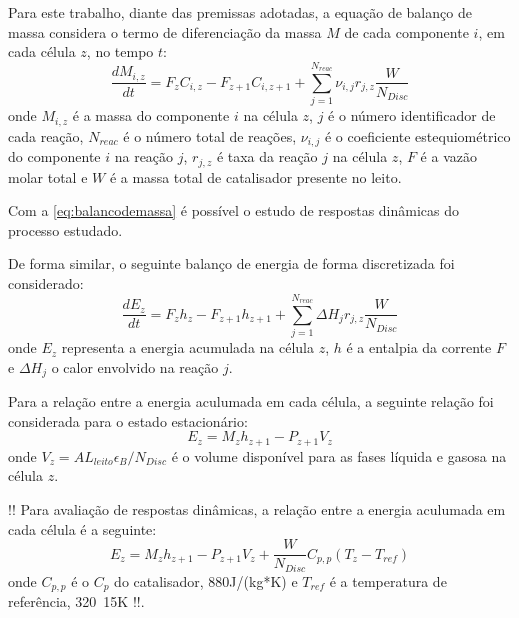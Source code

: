 Para este trabalho, diante das premissas adotadas, a equação de balanço de massa
considera o termo de diferenciação da massa $M$ de cada componente $i$, em cada
célula $z$, no tempo $t$: 
\begin{equation}
\dfrac{dM_{i,z}}{dt} = F_zC_{i,z} - F_{z+1}C_{i,z+1} +
\displaystyle\sum_{j=1}^{N_{reac}} \nu_{i,j}r_{j,z} \dfrac{W}{N_{Disc}}
\label{eq:balancodemassa}
\end{equation}
onde $M_{i,z}$ é a massa do componente $i$ na célula $z$, $j$ é o número
identificador de cada reação, $N_{reac}$ é o número total de reações,
$\nu_{i,j}$ é o coeficiente estequiométrico do componente $i$ na reação $j$,
$r_{j,z}$ é taxa da reação $j$ na célula $z$, $F$ é a vazão molar total e $W$ é
a massa total de catalisador presente no leito.

Com a \autoref{eq:balancodemassa} é possível o estudo de respostas dinâmicas do
processo estudado.


De forma similar, o seguinte balanço de energia de forma
discretizada foi considerado:
\begin{equation}
\dfrac{dE_{z}}{dt} = F_zh_{z} - F_{z+1}h_{z+1} +
\displaystyle\sum_{j=1}^{N_{reac}} \Delta H_{j}r_{j,z} \dfrac{W}{N_{Disc}}
\label{eq:balancodeenergia}
\end{equation}
onde $E_{z}$ representa a energia acumulada na célula $z$, $h$ é a entalpia da
corrente $F$ e $\Delta H_{j}$ o calor envolvido na reação $j$.

Para a relação entre a energia aculumada em cada célula, a seguinte relação
foi considerada para o estado estacionário:
\begin{equation}
E_{z} = M_{z}h_{z+1} - P_{z+1}V_{z}
\label{eq:holdupenergia}
\end{equation}
onde $V_{z} = AL_{leito}\epsilon_{B}/N_{Disc}$ é o volume disponível para as
fases líquida e gasosa na célula $z$.

!! Para avaliação de respostas dinâmicas, a relação entre a energia aculumada em
cada célula é a seguinte:
\begin{equation}
E_{z} = M_{z}h_{z+1} - P_{z+1}V_{z} +  \dfrac{W}{N_{Disc}}C_{p,p}(T_{z}-T_{ref})
\label{eq:holdupenergiadinamica}
\end{equation}
onde $C_{p,p}$ é o $C_p$ do catalisador, \si{880}{J/(kg*K)} e $T_{ref}$ é a
temperatura de referência, \si{320.15}{K} !!.

